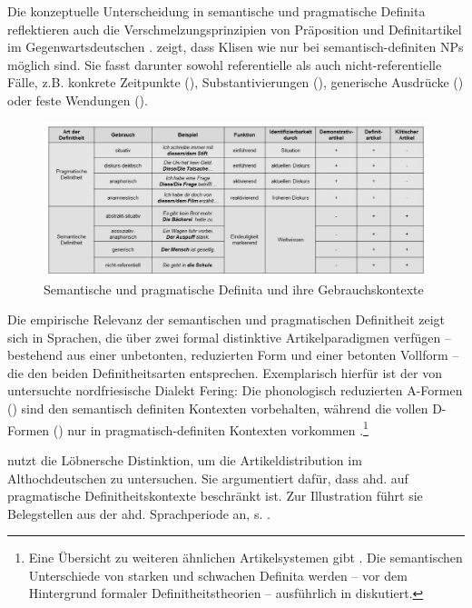 Die konzeptuelle Unterscheidung in semantische und pragmatische Definita reflektieren auch  die Verschmelzungsprinzipien von Präposition und Definitartikel im Gegenwartsdeutschen \parencite[311f.]{Lobner1985}. \textcite[109f.]{Nubling2005} zeigt, dass Klisen wie  nur bei semantisch-definiten NPs möglich sind. Sie fasst darunter sowohl referentielle als auch nicht-referentielle Fälle, z.B. konkrete Zeitpunkte (),  Substantivierungen (), generische Ausdrücke () oder feste Wendungen (). 

\begin{figure}[h]
\begin{center}
\includegraphics[width=12cm]{images/definit-kontexte-neu-sw.jpg}
\caption {Semantische und pragmatische Definita und ihre Gebrauchskontexte}
\label{abb:definita}
\end{center}
\end{figure}

Die empirische Relevanz der semantischen und pragmatischen Definitheit zeigt sich in Sprachen, die über zwei formal distinktive Artikelparadigmen verfügen -- bestehend aus einer unbetonten, reduzierten Form und einer betonten Vollform -- die den beiden Definitheitsarten entsprechen. Exemplarisch hierfür ist der von \textcite{Ebert1971} untersuchte  nordfriesische Dialekt Fering: Die phonologisch reduzierten A-Formen () sind den semantisch definiten Kontexten vorbehalten, während die vollen D-Formen () nur in pragmatisch-definiten Kontexten vorkommen \parencite[529]{deMulder2011}.\footnote{Eine Übersicht zu weiteren ähnlichen Artikelsystemen gibt \textcite[]{Studler2011}. Die semantischen Unterschiede von starken und schwachen Definita werden -- vor dem Hintergrund formaler Definitheitstheorien -- ausführlich in \textcite{Schwarz2009} diskutiert.}

\textcite[112-117]{Demske2001} nutzt die Löbnersche Distinktion, um die Artikeldistribution im Althochdeutschen zu untersuchen. Sie argumentiert dafür, dass ahd.   auf pragmatische Definitheitskontexte beschränkt ist. Zur Illustration führt sie Belegstellen aus der ahd. Sprachperiode an, s. . 

